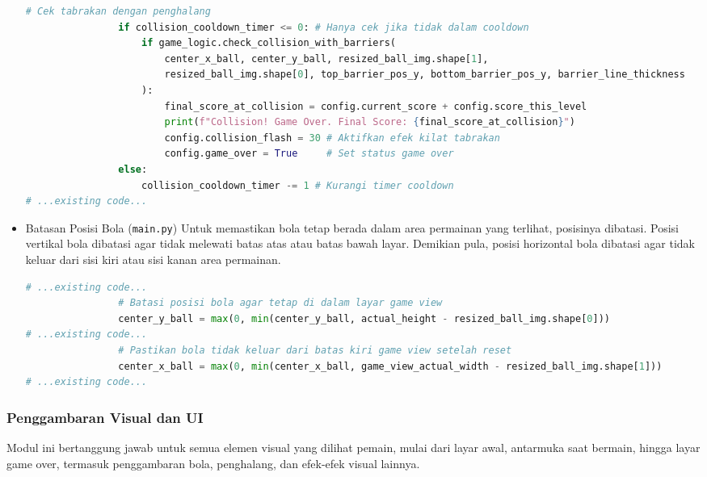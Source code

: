 \documentclass[11pt,a4paper]{article}
\begin{document}
\begin{itemize}
\begin{lstlisting}[language=Python, caption=Logika penanganan tabrakan]
                # Cek tabrakan dengan penghalang
                if collision_cooldown_timer <= 0: # Hanya cek jika tidak dalam cooldown
                    if game_logic.check_collision_with_barriers(
                        center_x_ball, center_y_ball, resized_ball_img.shape[1], 
                        resized_ball_img.shape[0], top_barrier_pos_y, bottom_barrier_pos_y, barrier_line_thickness
                    ):
                        final_score_at_collision = config.current_score + config.score_this_level
                        print(f"Collision! Game Over. Final Score: {final_score_at_collision}")
                        config.collision_flash = 30 # Aktifkan efek kilat tabrakan
                        config.game_over = True     # Set status game over
                else:
                    collision_cooldown_timer -= 1 # Kurangi timer cooldown
# ...existing code...
\end{lstlisting}
\item Batasan Posisi Bola (\texttt{main.py})
\newline Untuk memastikan bola tetap berada dalam area permainan yang terlihat, posisinya dibatasi. Posisi vertikal bola dibatasi agar tidak melewati batas atas atau batas bawah layar. Demikian pula, posisi horizontal bola dibatasi agar tidak keluar dari sisi kiri atau sisi kanan area permainan.
\begin{lstlisting}[language=Python, caption=Logika batasan posisi bola]
# ...existing code...
                # Batasi posisi bola agar tetap di dalam layar game view
                center_y_ball = max(0, min(center_y_ball, actual_height - resized_ball_img.shape[0]))
# ...existing code...
                # Pastikan bola tidak keluar dari batas kiri game view setelah reset
                center_x_ball = max(0, min(center_x_ball, game_view_actual_width - resized_ball_img.shape[1]))
# ...existing code...
\end{lstlisting}
\end{itemize}

\subsubsection{Penggambaran Visual dan UI}
Modul ini bertanggung jawab untuk semua elemen visual yang dilihat pemain, mulai dari layar awal, antarmuka saat bermain, hingga layar game over, termasuk penggambaran bola, penghalang, dan efek-efek visual lainnya.
\end{document}

